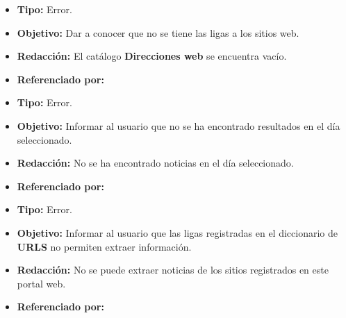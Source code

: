   
    \begin{itemize}
      \item \textbf{Tipo:} Error. 
      \item \textbf{Objetivo:}  Dar a conocer que no se tiene las ligas a los sitios web.
      \item \textbf{Redacción:} El catálogo \textbf{Direcciones web} se encuentra vacío.
      \item \textbf{Referenciado por:} \\
    \end{itemize}

  \begin{itemize}
    \item \textbf{Tipo:} Error. 
    \item \textbf{Objetivo:}  Informar al usuario que no se ha encontrado resultados en el día seleccionado.
    \item \textbf{Redacción:}  No se ha encontrado noticias en el día seleccionado.

    \item \textbf{Referenciado por:} \\
  \end{itemize}

  \begin{itemize}
    \item \textbf{Tipo:} Error. 
    \item \textbf{Objetivo:}  Informar al usuario que las ligas registradas en el diccionario de \textbf{URLS} no permiten extraer información.
    \item \textbf{Redacción:} No se puede extraer noticias de los sitios registrados en este portal web.
    \item \textbf{Referenciado por:} \\
  \end{itemize}

